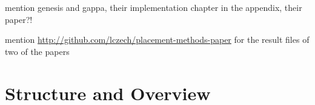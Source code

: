 mention genesis and gappa, their implementation chapter in the appendix,
their paper?!

mention  \url{http://github.com/lczech/placement-methods-paper} for the result files of two of the papers


\section{Structure and Overview}
\label{ch:Introduction:sec:StructureOverview}
